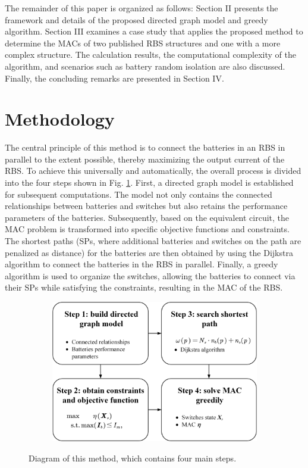 \documentclass{article}
\begin{document}
The remainder of this paper is organized as follows: 
Section II presents the framework and details of the proposed directed graph model and greedy algorithm. 
Section III examines a case study that applies the proposed method to determine the MACs of two published RBS structures and one with a more complex structure. 
The calculation results, the computational complexity of the algorithm, and scenarios such as battery random isolation are also discussed. 
Finally, the concluding remarks are presented in Section IV.

\section{Methodology}

The central principle of this method is to connect the batteries in an RBS in parallel to the extent possible, thereby maximizing the output current of the RBS.
To achieve this universally and automatically, the overall process is divided into the four steps shown in Fig. \ref{fig:main}.
First, a directed graph model is established for subsequent computations. The model not only contains the connected relationships between batteries and switches but also retains the performance parameters of the batteries.
Subsequently, based on the equivalent circuit, the MAC problem is transformed into specific objective functions and constraints.
The shortest paths (SPs, where additional batteries and switches on the path are penalized as distance) for the batteries are then obtained  by using the Dijkstra algorithm to connect the batteries in the RBS in parallel.
Finally, a greedy algorithm is used to organize the switches, allowing the batteries to connect via their SPs while satisfying the constraints, resulting in the MAC of the RBS.

\begin{figure}[htbp]
    \centering
    \begin{subfigure}[b]{0.8\textwidth}
        \includegraphics[width=\textwidth]{main.png}
    \end{subfigure}
    \caption{ 
        Diagram of this method, which contains four main steps.
    }
    \label{fig:main}
\end{figure}
\end{document}
